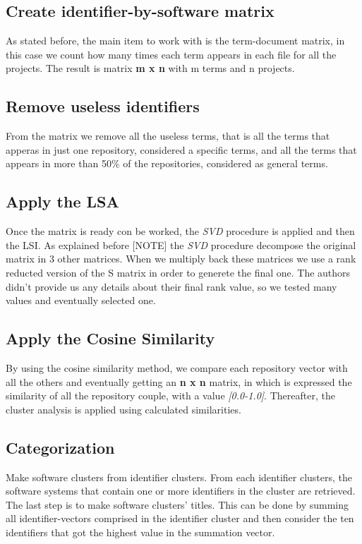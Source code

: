 \subsection{Create identifier-by-software matrix}
As stated before, the main item to work with is the term-document matrix, in this case we count how many times each term appears in each file for all the projects. The result is matrix \textbf{m x n} with m terms and n projects.

\subsection{Remove useless identifiers}
From the matrix we remove all the useless terms, that is all the terms that apperas in just one repository, considered a specific terms, and all the terms that appears in more than 50\% of the repositories, considered as general terms.

\subsection{Apply the LSA}
Once the matrix is ready con be worked, the \emph{SVD} procedure is applied and then the LSI. As explained before [NOTE] the \emph{SVD} procedure decompose the original matrix in 3 other matrices. When we multiply back these matrices we use a rank reducted version of the S matrix in order to generete the final one. The authors didn't provide us any details about their final rank value, so we tested many values and eventually selected one.

\subsection{Apply the Cosine Similarity}
By using the cosine similarity method, we compare each repository vector with all the others and eventually getting an \textbf{n x n} matrix, in which is expressed the similarity of all the repository couple, with a value \emph{[0.0-1.0]}. Thereafter, the cluster analysis is applied using calculated similarities. 

\subsection{Categorization}
Make software clusters from identifier clusters. From each identifier clusters, the software systems that contain one or more identifiers in the cluster are retrieved. The last step is to make software clusters’ titles. This can be done by summing all identifier-vectors comprised in the identifier cluster and then consider the ten identifiers that got the highest value in the summation vector.

